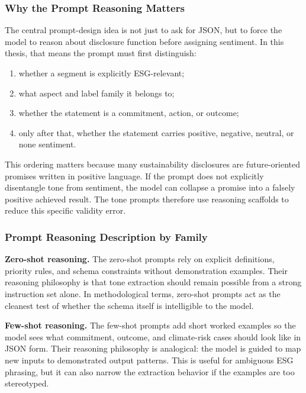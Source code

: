 \documentclass[english, online, cse, master]{dithesis}
\providecommand{\tightlist}{\setlength{\itemsep}{0pt}\setlength{\parskip}{0pt}}
\begin{document}
\subsubsection{Why the Prompt Reasoning Matters}\label{why-the-prompt-reasoning-matters}

The central prompt-design idea is not just to ask for JSON, but to force the model to reason about disclosure function before assigning sentiment. In this thesis, that means the prompt must first distinguish:

\begin{enumerate}
\def\labelenumi{\arabic{enumi}.}
\tightlist
\item
  whether a segment is explicitly ESG-relevant;
\item
  what aspect and label family it belongs to;
\item
  whether the statement is a commitment, action, or outcome;
\item
  only after that, whether the statement carries positive, negative, neutral, or none sentiment.
\end{enumerate}

This ordering matters because many sustainability disclosures are future-oriented promises written in positive language. If the prompt does not explicitly disentangle tone from sentiment, the model can collapse a promise into a falsely positive achieved result. The tone prompts therefore use reasoning scaffolds to reduce this specific validity error.

\subsubsection{Prompt Reasoning Description by Family}\label{prompt-reasoning-description-by-family}

\textbf{Zero-shot reasoning.} The zero-shot prompts rely on explicit definitions, priority rules, and schema constraints without demonstration examples. Their reasoning philosophy is that tone extraction should remain possible from a strong instruction set alone. In methodological terms, zero-shot prompts act as the cleanest test of whether the schema itself is intelligible to the model.

\textbf{Few-shot reasoning.} The few-shot prompts add short worked examples so the model sees what commitment, outcome, and climate-risk cases should look like in JSON form. Their reasoning philosophy is analogical: the model is guided to map new inputs to demonstrated output patterns. This is useful for ambiguous ESG phrasing, but it can also narrow the extraction behavior if the examples are too stereotyped.
\end{document}
